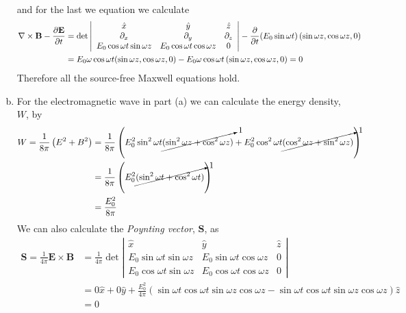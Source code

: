 \documentclass[11pt]{article}
\numberwithin{equation}{section}
\begin{document}
\begin{enumerate}[(a)]
\begin{align*}
    \end{align*}
    and for the last we equation we calculate 
    \begin{align*}
        \bold\nabla\times\mathbf{B} - \frac{\partial{\mathbf{E}}}{\partial{t}} &= \det\left|\begin{array}{ccc}
                                                \hat{x}                       &\hat{y}                        &\hat{z}\\
                                                \partial_{x}                  &\partial_{y}                   &\partial_{z}\\
                                                E_0\cos\omega{t}\sin\omega{z} &E_0\cos\omega{t}\cos\omega{z} &0 
    \end{array}\right| - \frac{\partial{}}{\partial{t}}(E_0\sin\omega{t})\left(\sin\omega{z},\cos\omega{z},0\right)\\
    &= E_0\omega\cos\omega{t}(\sin\omega{z},\cos\omega{z},0) - E_0\omega\cos\omega{t}\left(\sin\omega{z},\cos\omega{z},0\right) = 0
    \end{align*}
    Therefore all the source-free Maxwell equations hold.

\item
    For the electromagnetic wave in part (a) we can calculate the energy density, $W$, by
    \begin{align*}
        W = \frac{1}{8\pi}\left(E^2+B^2\right) &= \frac{1}{8\pi}\left(E_0^2\sin^2\omega{t}\cancelto{1}{(\sin^2\omega{z}+\cos^2\omega{z})} + E_0^2\cos^2\omega{t}\cancelto{1}{(\cos^2\omega{z}+\sin^2\omega{z})}\right)\\
                                               &= \frac{1}{8\pi}\left(E_0^2\cancelto{1}{(\sin^2\omega{t}+\cos^2\omega{t})}\right)\\
                                               &= \frac{E_0^2}{8\pi}
    \end{align*}
    We can also calculate the \emph{Poynting vector}, $\mathbf{S}$, as
    \begin{align*}
        \mathbf{S} = \frac{1}{4\pi}\mathbf{E}\times\mathbf{B} &= \frac{1}{4\pi}\det\left|\begin{array}{ccc}
                                                \hat{x}                       &\hat{y}                       &\hat{z}\\
                                                E_0\sin\omega{t}\sin\omega{z} &E_0\sin\omega{t}\cos\omega{z} &0      \\
                                                E_0\cos\omega{t}\sin\omega{z} &E_0\cos\omega{t}\cos\omega{z} &0 
                                                                    \end{array}\right|\\
                                                                    &= 0\hat{x} + 0\hat{y} + \frac{E_0^2}{4\pi}(\sin\omega{t}\cos\omega{t}\sin\omega{z}\cos\omega{z}-\sin\omega{t}\cos\omega{t}\sin\omega{z}\cos\omega{z})\hat{z}\\
                                                &=0
    \end{align*}


\end{enumerate}
\end{document}
